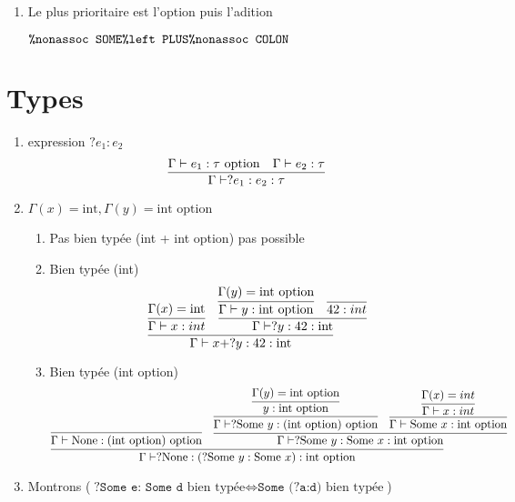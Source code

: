 \documentclass{article}
\theoremstyle{plain}
\begin{document}
\begin{enumerate}
  \item Le plus prioritaire est l'option puis l'adition

    $ \texttt{\%nonassoc SOME}\\
        \texttt{\%left PLUS}\\ 
        \texttt{\%nonassoc COLON}$
    
\end{enumerate}

\section{Types}
\begin{enumerate}
  \item expression $? e_1 : e_2$ 
    \[
    \infer{\Gamma \vdash ?e_1 : e_2 : \tau}
    {\Gamma \vdash e_1 : \tau\text{ option} & \Gamma \vdash e_2 : \tau}
  \]

\item $\Gamma(x) = \text{int}, \Gamma(y) = \text{int option}$ 
  \begin{enumerate}
    \item Pas bien typée (int + int option) pas possible

    \item Bien typée (int)
    \[
      \infer{\Gamma \vdash x + ?y:42 : \text{int}}
      {
        \infer{\Gamma \vdash x : int}{\Gamma(x) = \text{int}}
      &
        \infer{\Gamma \vdash ?y:42 : \text{int}}
        {
          \infer{\Gamma \vdash y : \text{int option}}{\Gamma (y) = \text{int option}}
          &
          \infer{42 : int}{}
        }
      }
    \]

    \item Bien typée (int option)
    \[
      \infer{\Gamma \vdash ?\text{None}: (?\text{Some } y: \text{Some } x) : \text{int option}}
      {
        \infer{\Gamma \vdash \text{None} : \text{(int option) option}}{}
        &
        \infer{\Gamma \vdash ?\text{Some } y: \text{Some } x : \text{int option}}
        {
          \infer{\Gamma \vdash ?\text{Some } y: \text{(int option) option}}
            {\infer{y : \text{int option}}{\Gamma(y) = \text{int option}}}
          &
          \infer{\Gamma \vdash \text{Some } x : \text{int option}}
            {\infer{\Gamma \vdash x : int}{\Gamma(x) = int}}
        }
      }
    \]
  \end{enumerate}

\item Montrons ($\texttt{?Some e: Some d} \text{ bien typée} \Leftrightarrow 
  \texttt{Some (?a:d)} \text{ bien typée}$)


\end{enumerate}
\end{document}
